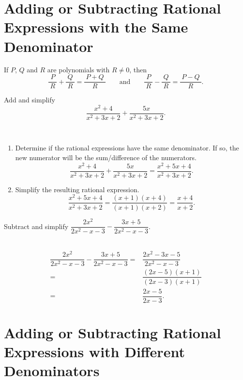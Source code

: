 \documentclass[en,12pt]{elegantbook}
\providecommand{\tightlist}{%
  \setlength{\itemsep}{0pt}\setlength{\parskip}{0pt}}
\let\BeginKnitrBlock\begin \let\EndKnitrBlock\end
\begin{document}
\hypertarget{adding-or-subtracting-rational-expressions-with-the-same-denominator}{%
\section{Adding or Subtracting Rational Expressions with the Same Denominator}\label{adding-or-subtracting-rational-expressions-with-the-same-denominator}}

If \(P\), \(Q\) and \(R\) are polynomials with \(R\neq 0\), then
\[
\dfrac{~P~}{~R~}+\dfrac{~Q~}{~R~}=\dfrac{~P+Q~}{~R~}\qquad \text{and} \qquad
\dfrac{~P~}{~R~}-\dfrac{~Q~}{~R~}=\dfrac{~P-Q~}{~R~}.
\]

\BeginKnitrBlock{example}
\protect\hypertarget{exm:unnamed-chunk-51}{}{\label{exm:unnamed-chunk-51} }
Add and simplify\\
\[
\dfrac{x^2+4}{x^2+3x+2}+\dfrac{5x}{x^2+3x+2}.
\]
\EndKnitrBlock{example}

\BeginKnitrBlock{solution}
{}\\

\begin{enumerate}
\def\labelenumi{\arabic{enumi}.}
\tightlist
\item
  Determine if the rational expressions have the same denominator. If so, the new numerator will be the sum/difference of the numerators.
  \[
   \dfrac{x^2+4}{x^2+3x+2}+\dfrac{5x}{x^2+3x+2}=\dfrac{x^2+5x+4}{x^2+3x+2}.
  \]
\item
  Simplify the resulting rational expression.
  \[
   \dfrac{x^2+5x+4}{x^2+3x+2}=\dfrac{(x+1)(x+4)}{(x+1)(x+2)}=\dfrac{x+4}{x+2}.
  \]
\end{enumerate}
\EndKnitrBlock{solution}

\BeginKnitrBlock{example}
\protect\hypertarget{exm:unnamed-chunk-53}{}{\label{exm:unnamed-chunk-53} }
Subtract and simplify \(\dfrac{2x^2}{2x^2-x-3}-\dfrac{3x+5}{2x^2-x-3}\).
\EndKnitrBlock{example}

\BeginKnitrBlock{solution}
{}\\

\[
\begin{aligned}
    \dfrac{2x^2}{2x^2-x-3}-\dfrac{3x+5}{2x^2-x-3}=&\dfrac{2x^2-3x-5}{2x^2-x-3}\\
    =&\dfrac{(2x-5)(x+1)}{(2x-3)(x+1)}\\
    =&\dfrac{2x-5}{2x-3}.
\end{aligned}
\]
\EndKnitrBlock{solution}

\hypertarget{adding-or-subtracting-rational-expressions-with-different-denominators}{%
\section{Adding or Subtracting Rational Expressions with Different Denominators}\label{adding-or-subtracting-rational-expressions-with-different-denominators}}
\end{document}
